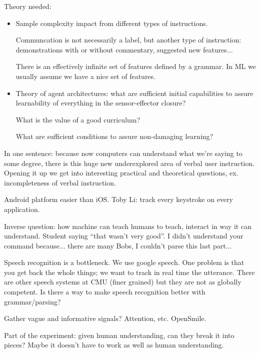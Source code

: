 Theory needed:
\begin{itemize}
\item
Sample complexity impact from different types of instructions.

Communcation is not necessarily a label, but another type of instruction: demonstrations with or without commentary, suggested new features...

There is an effectively infinite set of features defined by a grammar. In ML we usually assume we have a nice set of features.
\item
Theory of agent architectures: what are sufficient initial capabilities to assure learnability of everything in the sensor-effector closure?

What is the value of a good curriculum?

What are sufficient conditions to assure non-damaging learning?
\end{itemize}

In one sentence: because now computers can understand what we're saying to some degree, there is this huge new underexplored area of verbal user instruction. %
Opening it up we get into interesting practical and theoretical questions, ex. incompleteness of verbal instruction.

Android platform easier than iOS. Toby Li: track every keystroke on every application.

Inverse question: how machine can teach humans to teach, interact in way it can understand. Student saying ``that wasn't very good''. I didn't understand your command because... there are many Bobs, I couldn't parse this last part...

Speech recognition is a bottleneck. We use google speech. One problem is that you get back the whole things; we want to track in real time the utterance. There are other speech systems at CMU (finer grained) but they are not as globally competent.
Is there a way to make speech recognition better with grammar/parsing?


Gather vague and informative signals? Attention, etc. OpenSmile.


Part of the experiment: given human understanding, can they break it into pieces? Maybe it doesn't have to work as well as human understanding.




